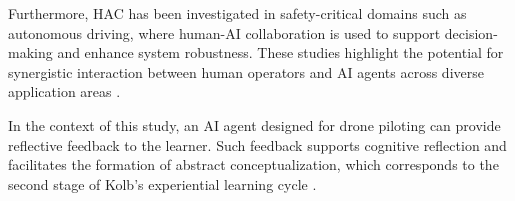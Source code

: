 Furthermore, HAC has been investigated in safety-critical domains such as autonomous driving, where human-AI collaboration is used to support decision-making and enhance system robustness. These studies highlight the potential for synergistic interaction between human operators and AI agents across diverse application areas \parencite{gao2025humancenteredhumanaicollaborationhchac}.

In the context of this study, an AI agent designed for drone piloting can provide reflective feedback to the learner. Such feedback supports cognitive reflection and facilitates the formation of abstract conceptualization, which corresponds to the second stage of Kolb's experiential learning cycle \parencite{kolb1984}.

